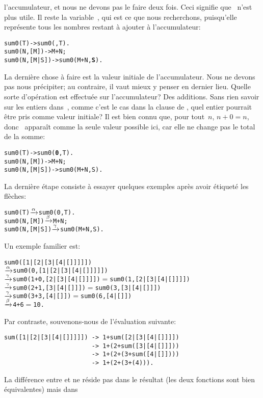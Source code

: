 l'accumulateur, et nous ne devons pas le faire deux fois. Ceci
signifie que~ n'est plus utile. Il reste la
variable~, qui est ce que nous recherchons, puisqu'elle
représente tous les nombres restant à ajouter à l'accumulateur:
\begin{alltt}
sum0(T)       -> sum0(,T).
sum0(N,[M])   -> M+N;
sum0(N,[M|S]) -> sum0(M+N,\textbf{S}).
\end{alltt}
La dernière chose à faire est la valeur initiale de
l'accumulateur. Nous ne devons pas nous précipiter; au contraire, il
vaut mieux y penser en dernier lieu. Quelle sorte d'opération est
effectuée sur l'accumulateur? Des additions. Sans rien savoir sur les
entiers dans~, comme c'est le cas dans la clause de
, quel entier pourrait être pris comme valeur
initiale? Il est bien connu que, pour tout~\(n\), \(n + 0 = n\), donc
~apparaît comme la seule valeur possible ici, car elle ne
change pas le total de la somme:
\begin{alltt}
sum0(T)       -> sum0(\textbf{0},T).
sum0(N,[M])   -> M+N;
sum0(N,[M|S]) -> sum0(M+N,S).
\end{alltt}
La dernière étape consiste à essayer quelques exemples après avoir
étiqueté les flèches:
\begin{alltt}
sum0(T)        \(\xrightarrow{\smash[t]{\alpha}}\) sum0(0,T).
sum0(N,[M])   \(\xrightarrow{\smash[t]{\beta}}\) M+N;
sum0(N,[M|S]) \(\xrightarrow{\smash[t]{\gamma}}\) sum0(M+N,S).
\end{alltt}
Un exemple familier est:
\begin{alltt}
sum0([1|[2|[3|[4|[]]]]])
  \(\xrightarrow{\smash[t]{\alpha}}\) sum0(0,[1|[2|[3|[4|[]]]]])
  \(\xrightarrow{\smash[t]{\gamma}}\) sum0(1+0,[2|[3|[4|[]]]])   \(=\) sum0(1,[2|[3|[4|[]]]])
  \(\xrightarrow{\smash[t]{\gamma}}\) sum0(2+1,[3|[4|[]]])       \(=\) sum0(3,[3|[4|[]]])
  \(\xrightarrow{\smash[t]{\gamma}}\) sum0(3+3,[4|[]])           \(=\) sum0(6,[4|[]])
  \(\xrightarrow{\smash[t]{\beta}}\) 4 + 6                      \(=\) 10\textrm{.}
\end{alltt}
Par contraste, souvenons-nous de l'évaluation suivante:
\begin{verbatim}
sum([1|[2|[3|[4|[]]]]]) -> 1+sum([2|[3|[4|[]]]])
                        -> 1+(2+sum([3|[4|[]]]))
                        -> 1+(2+(3+sum([4|[]])))
                        -> 1+(2+(3+(4))).
\end{verbatim}
La différence entre  et  ne réside pas
dans le résultat (les deux fonctions sont bien équivalentes) mais dans
